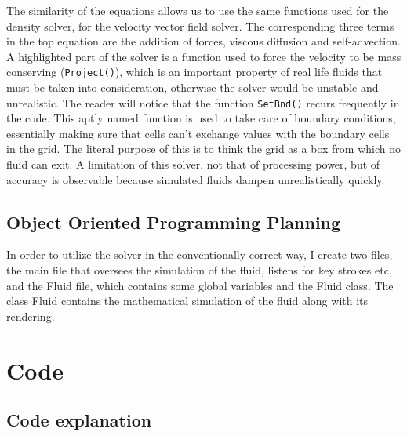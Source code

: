 \documentclass[12pt,a4paper]{book}
\begin{document}
The similarity of the equations allows us to use the same functions used for the density solver, for the velocity vector field solver. The corresponding three terms in the top equation are the addition of forces, viscous diffusion and self-advection. A highlighted part of the solver is a function used to force the velocity to be mass conserving (\verb|Project()|), which is an important property of real life fluids that must be taken into consideration, otherwise the solver would be unstable and unrealistic. The reader will notice that the function \verb|SetBnd()| recurs frequently in the code. This aptly named function is used to take care of boundary conditions, essentially making sure that cells can't exchange values with the boundary cells in the grid. The literal purpose of this is to think the grid as a box from which no fluid can exit. A limitation of this solver, not that of processing power, but of accuracy is observable because simulated fluids dampen unrealistically quickly.

\section{Object Oriented Programming Planning}
In order to utilize the solver in the conventionally correct way, I create two files; the main file that oversees the simulation of the fluid, listens for key strokes etc, and the Fluid file, which contains some global variables and the Fluid class. The class Fluid contains the mathematical simulation of the fluid along with its rendering.



\chapter{Code}

\section{Code explanation}
\end{document}
